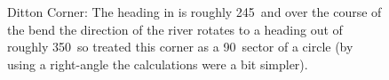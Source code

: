       \begin{figure}
      \begin{center}
        \caption{Ditton Corner: The heading in is roughly 245\textdegree\ and over the course of the bend the direction of the river rotates to a heading out of roughly 350\textdegree\ so treated this corner as a 90\textdegree\ sector of a circle (by using a right-angle the calculations were a bit simpler).}
        \label{fig:dittoncorner:angle}
      \end{center}
      \end{figure}
      
